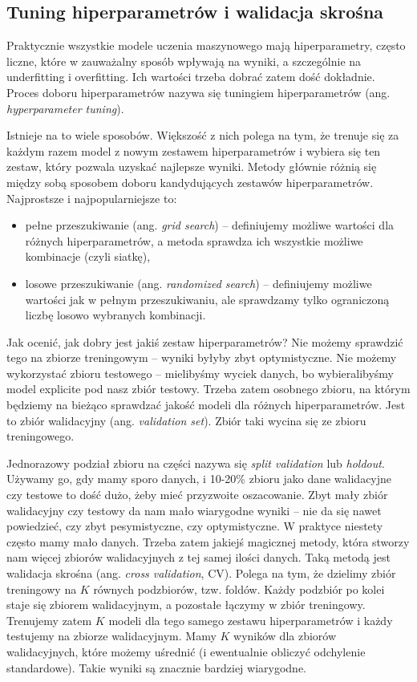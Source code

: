 \documentclass{myclass}
\begin{document}
\subsection{Tuning hiperparametrów i walidacja skrośna}

Praktycznie wszystkie modele uczenia maszynowego mają hiperparametry, często liczne, które w
zauważalny sposób wpływają na wyniki, a szczególnie na underfitting i overfitting. Ich wartości
trzeba dobrać zatem dość dokładnie. Proces doboru hiperparametrów nazywa się tuningiem
hiperparametrów (ang. \emph{hyperparameter tuning}).

Istnieje na to wiele sposobów. Większość z nich polega na tym, że trenuje się za każdym razem model
z nowym zestawem hiperparametrów i wybiera się ten zestaw, który pozwala uzyskać najlepsze wyniki.
Metody głównie różnią się między sobą sposobem doboru kandydujących zestawów hiperparametrów.
Najprostsze i najpopularniejsze to:
\begin{itemize}
\item pełne przeszukiwanie (ang. \emph{grid search}) -- definiujemy możliwe wartości dla różnych
hiperparametrów, a metoda sprawdza ich wszystkie możliwe kombinacje (czyli siatkę),

\item losowe przeszukiwanie (ang. \emph{randomized search}) -- definiujemy możliwe wartości jak w
pełnym przeszukiwaniu, ale sprawdzamy tylko ograniczoną liczbę losowo wybranych kombinacji.
\end{itemize}

Jak ocenić, jak dobry jest jakiś zestaw hiperparametrów? Nie możemy sprawdzić tego na zbiorze
treningowym -- wyniki byłyby zbyt optymistyczne. Nie możemy wykorzystać zbioru testowego --
mielibyśmy wyciek danych, bo wybieralibyśmy model explicite pod nasz zbiór testowy. Trzeba zatem
osobnego zbioru, na którym będziemy na bieżąco sprawdzać jakość modeli dla różnych hiperparametrów.
Jest to zbiór walidacyjny (ang. \emph{validation set}). Zbiór taki wycina się ze zbioru
treningowego.

Jednorazowy podział zbioru na części nazywa się \emph{split validation} lub \emph{holdout}. Używamy
go, gdy mamy sporo danych, i 10-20\% zbioru jako dane walidacyjne czy testowe to dość dużo, żeby
mieć przyzwoite oszacowanie. Zbyt mały zbiór walidacyjny czy testowy da nam mało wiarygodne wyniki
-- nie da się nawet powiedzieć, czy zbyt pesymistyczne, czy optymistyczne. W praktyce niestety
często mamy mało danych. Trzeba zatem jakiejś magicznej metody, która stworzy nam więcej zbiorów
walidacyjnych z tej samej ilości danych. Taką metodą jest walidacja skrośna (ang. \emph{cross
validation}, CV). Polega na tym, że dzielimy zbiór treningowy na \(K\) równych podzbiorów, tzw.
foldów. Każdy podzbiór po kolei staje się zbiorem walidacyjnym, a pozostałe łączymy w zbiór
treningowy. Trenujemy zatem \(K\) modeli dla tego samego zestawu hiperparametrów i każdy testujemy
na zbiorze walidacyjnym. Mamy \(K\) wyników dla zbiorów walidacyjnych, które możemy uśrednić (i
ewentualnie obliczyć odchylenie standardowe). Takie wyniki są znacznie bardziej wiarygodne.
\end{document}
